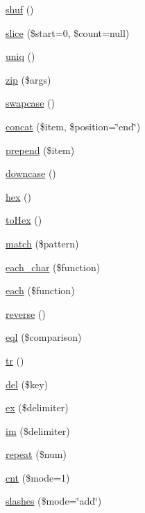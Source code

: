 \begin{DoxyCompactItemize}
\item 
\hyperlink{classr_a6595f5d5f838d64df0210138f2cef0bd}{shuf} ()
\item 
\hyperlink{classr_ae01473d9a4d7f2c33c1a157b9cce13f4}{slice} (\$start=0, \$count=null)
\item 
\hyperlink{classr_a032c9d1b1b6ac32627b95225479aa7c0}{uniq} ()
\item 
\hyperlink{classr_a2dba4fd3850e2c373dad4604d170dfa6}{zip} (\$args)
\item 
\hyperlink{classr_a04980c8e9024c09c700fdf68df9d5775}{swapcase} ()
\item 
\hyperlink{classr_a69c3762d52c367c08ca4dd234f5576df}{concat} (\$item, \$position=\char`\"{}end\char`\"{})
\item 
\hyperlink{classr_a7e2ed8a2b96e8c0340390647f081557c}{prepend} (\$item)
\item 
\hyperlink{classr_ac627a4ea49a87091d67dd7e1319bc872}{downcase} ()
\item 
\hyperlink{classr_a0c6f82bc490087648b9f1fef553e05eb}{hex} ()
\item 
\hyperlink{classr_a59e26fcd3f578f30737550623859abe7}{to\-Hex} ()
\item 
\hyperlink{classr_a59c310be108326e741acb1a678ff9bbe}{match} (\$pattern)
\item 
\hyperlink{classr_a52486765aad19321ca30127f786ca709}{each\-\_\-char} (\$function)
\item 
\hyperlink{classr_a6c0a4c47b3531bcc641e0aa02e155f00}{each} (\$function)
\item 
\hyperlink{classr_a601c54a2a4082e5d8dfc4509b07ea958}{reverse} ()
\item 
\hyperlink{classr_a3a9f9703b0a2b7a455a1e109f96f706d}{eql} (\$comparison)
\item 
\hyperlink{classr_a93130ece3f9aced2dcacf00ec6968413}{tr} ()
\item 
\hyperlink{classr_a4be48cfb26bfde30df2a0954ee852591}{del} (\$key)
\item 
\hyperlink{classr_ae05789292fafbb86600f74343762296c}{ex} (\$delimiter)
\item 
\hyperlink{classr_acb799c47bea88bda888622f887871c1c}{im} (\$delimiter)
\item 
\hyperlink{classr_ab924f20be77fca419f8433a2c8df810a}{repeat} (\$num)
\item 
\hyperlink{classr_ad8ade07cf9fec6dddec76822547a34b2}{cnt} (\$mode=1)
\item 
\hyperlink{classr_aee99d6b6d0c3479c48a98e76de963e06}{slashes} (\$mode=\char`\"{}add\char`\"{})

\end{DoxyCompactItemize}

